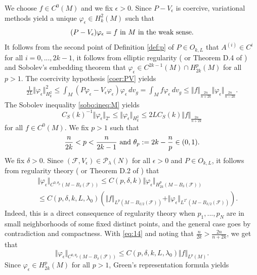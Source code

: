\documentclass[reqno]{amsart}
\def \eps {\epsilon}
\def \crit {2^\star}
\def \Pl {{\mathcal P}_\lambda}
\def \F {{\mathcal F}}
\begin{document}
\medskip{} We choose $f\in C^{0}(M)$ and we fix $\eps>0$. Since $P-V_\eps$ is coercive, variational methods yield a unique  $\varphi_\eps\in H_k^2(M)$ such that 
$$(P-V_\eps)\varphi_\eps=f\hbox{ in }M\hbox{ in the weak sense.}$$
It follows from the second point of Definition   \ref{def:p} of $P\in O_{k,L}$ that $A^{(i)}\in C^{i}$ for all $i=0,...,2k-1$, it follows from elliptic regularity (\cite{ADN} or Theorem D.4 of \cite{robert:gjms}) and Sobolev's embedding theorem that $\varphi_\eps\in C^{2k-1}(M)\cap H_{2k}^p(M)$ for all $p>1$. The coercivity hypothesis \eqref{coer:PV} yields
\begin{eqnarray*}
\frac{1}{2L}\Vert \varphi_\eps\Vert_{H_k^2}^2\leq \int_M (P\varphi_\eps-V_\eps\varphi_\eps)\varphi_\eps\, dv_g=\int_M f\varphi_\eps\, dv_g\leq \Vert f\Vert_{\frac{2n}{n+2k}}\Vert\varphi_\eps\Vert_{\frac{2n}{n-2k}}.
\end{eqnarray*}
The Sobolev  inequality \eqref{sobo:ineq:M} yields
\begin{equation}\label{eq:14}
C_S(k)^{-1}\Vert\varphi_\eps\Vert_{\crit}\leq \Vert\varphi_\eps \Vert_{H_k^2}\leq 2LC_S(k)\Vert f\Vert_{\frac{2n}{n+2k}}
\end{equation}
for all $f\in C^{0}(M)$. We fix $p>1$ such that
$$\frac{n}{2k}<p<\frac{n}{2k-1}\hbox{ and }\theta_p:=2k-\frac{n}{p}\in (0,1).$$
We fix $\delta>0$. Since $(\F,V_\eps)\in \Pl(N)$ for all $\eps>0$ and $P\in O_{k,L}$, it follows from
regularity theory (\cite{ADN} or Theorem D.2 of \cite{robert:gjms}) that
\begin{eqnarray}
&&\Vert\varphi_\eps\Vert_{C^{0,\theta_p}(M -  B_\delta(\F))}\leq  C(p,\delta,k)\Vert \varphi_\eps\Vert_{H_{2k}^p(M -   B_\delta(\F))}\label{case:F:F0}\\
&&\leq C(p,\delta,k, L,\lambda_0) \left(\Vert f\Vert_{L^p(M -   B_{\delta/2}(\F))}+\Vert \varphi_\eps\Vert_{L^{\crit}(M -   B_{\delta/2}(\F))}\right).\nonumber
\end{eqnarray}
Indeed, this is a direct consequence of regularity theory when $p_1,...,p_N$ are in small neighborhoods of some fixed distinct points, and the general case goes by contradiction and compactness. With \eqref{eq:14} and noting that $\frac{n}{2k}>\frac{2n}{n+2k}$, we get that
\begin{equation*}
\Vert\varphi_\eps\Vert_{C^{0,\theta_p}(M -   B_\delta(\F))}\leq  C(p,\delta,k, L,\lambda_0) 
\Vert f\Vert_{L^p(M)}.
\end{equation*}
Since $\varphi_\eps\in H_{2k}^p(M)$ for all $p>1$, Green's representation formula  yields
\end{document}
